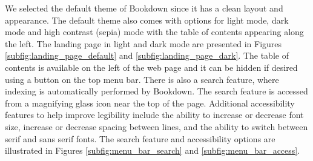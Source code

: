 \documentclass[11pt]{article}
\begin{document}
We selected the default theme of Bookdown since it has a clean layout and appearance.
The default theme also comes with options for light mode, dark mode and high contrast (sepia) mode with the table of contents appearing along the left.
The landing page in light and dark mode are presented in Figures \ref{subfig:landing_page_default} and \ref{subfig:landing_page_dark}.
The table of contents is available on the left of the web page and it can be hidden if desired using a button on the top menu bar.
There is also a search feature, where indexing is automatically performed by Bookdown. The search feature is accessed from a magnifying glass icon near the top of the page.
Additional accessibility features to help improve legibility include the ability to increase or decrease font size, increase or decrease spacing between lines, and the ability to switch between serif and sans serif fonts. The search feature and accessibility options are illustrated in Figures \ref{subfig:menu_bar_search} and \ref{subfig:menu_bar_access}.

\end{document}
